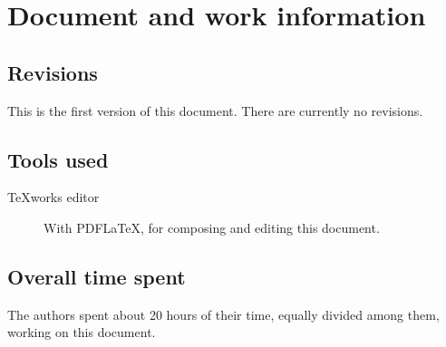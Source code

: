 \chapter{Document and work information}

\section{Revisions}
This is the first version of this document. There are currently no revisions.

\section{Tools used}
\begin{description}
\item[TeXworks editor] With PDF\LaTeX{}, for composing and editing this document.
\end{description}

\section{Overall time spent}
The authors spent about 20 hours of their time, equally divided among them, working on this document.